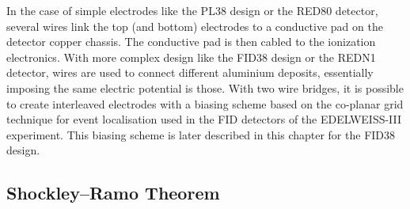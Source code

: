 In the case of simple electrodes like the PL38 design or the RED80 detector, several wires link the top (and bottom) electrodes to a conductive pad on the detector copper chassis. The conductive pad is then cabled to the ionization electronics.
With more complex design like the FID38 design or the REDN1 detector, wires are used to connect different aluminium deposits, essentially imposing the same electric potential is those. With two wire bridges, it is possible to create interleaved electrodes with a biasing scheme based on the co-planar grid technique for event localisation used in the FID detectors of the EDELWEISS-III experiment. This biasing scheme is later described in this chapter for the FID38 design.

\subsection{Shockley–Ramo Theorem}
\label{par:shockley-ramo}


